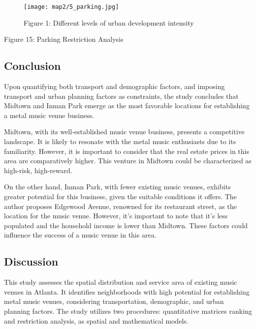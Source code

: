 \documentclass[11pt]{article}
\begin{document}
\begin{figure}[H]
\begin{center}
\centering
\texttt{[image: map2/5\_parking.jpg]}
\caption{Figure 1: Different levels of urban development intensity}
\label{fig:figure1}
\end{center}
\end{figure}

\begin{center}
\centering
Figure 15: Parking Restriction Analysis
\end{center}

\subsection{Conclusion}
Upon quantifying both transport and demographic factors, and imposing transport and urban planning factors as constraints, the study concludes that Midtown and Inman Park emerge as the most favorable locations for establishing a metal music venue business.

Midtown, with its well-established music venue business, presents a competitive landscape. It is likely to resonate with the metal music enthusiasts due to its familiarity. However, it is important to consider that the real estate prices in this area are comparatively higher. This venture in Midtown could be characterized as high-risk, high-reward.

On the other hand, Inman Park, with fewer existing music venues, exhibits greater potential for this business, given the suitable conditions it offers. The author proposes Edgewood Avenue, renowned for its restaurant street, as the location for the music venue. However, it’s important to note that it’s less populated and the household income is lower than Midtown. These factors could influence the success of a music venue in this area. 

\subsection{Discussion}

This study assesses the spatial distribution and service area of existing music venues in Atlanta. It identifies neighborhoods with high potential for establishing metal music venues, considering transportation, demographic, and urban planning factors. The study utilizes two procedures: quantitative matrices ranking and restriction analysis, as spatial and mathematical models.
\end{document}

